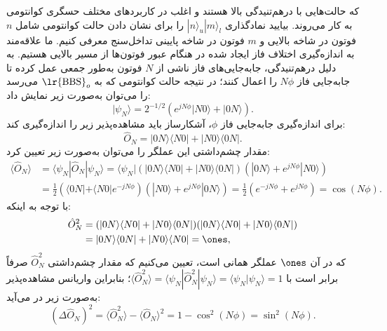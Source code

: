 که حالت‌هایی با درهم‌تنیدگی بالا هستند و اغلب در کاربردهای مختلف حسگری کوانتومی به کار می‌روند. بیایید نمادگذاری $|n\rangle_u |m\rangle_l$ را برای نشان دادن حالت کوانتومی شامل $n$ فوتون در شاخه بالایی و $m$ فوتون در شاخه پایینی تداخل‌سنج  معرفی کنیم. ما علاقه‌مند به اندازه‌گیری اختلاف فاز ایجاد شده در هنگام عبور فوتون‌ها از مسیر بالایی هستیم. به دلیل درهم‌تنیدگی، جابه‌جایی‌های فاز ناشی از $N$ فوتون به‌طور جمعی عمل کرده تا جابه‌جایی فاز $N\phi$ را اعمال کنند؛ در نتیجه حالت کوانتومی که به $\text{\lr{BBS}}_o$ می‌رسد را می‌توان به‌صورت زیر نمایش داد:
\begin{equation}
	|\psi_N\rangle = 2^{-1/2} (e^{jN\phi}|N0\rangle + |0N\rangle).
	\label{eq:11-31}
\end{equation}
برای اندازه‌گیری جابه‌جایی فاز $\phi$، آشکارساز باید مشاهده‌پذیر زیر را اندازه‌گیری کند:
\begin{equation}
	\hat{O}_N = |0N\rangle \langle N0| + |N0\rangle \langle 0N|.
	\label{eq:11-32}
\end{equation}
مقدار چشم‌داشتی این عملگر را می‌توان به‌صورت زیر تعیین کرد:
\begin{equation}
	\begin{aligned}
		\langle \hat{O}_N \rangle &= \langle \psi_N | \hat{O}_N | \psi_N \rangle = \langle \psi_N | (|0N\rangle \langle N0| + |N0\rangle \langle 0N|) (|0N\rangle + e^{jN\phi}|N0\rangle) \\
		&= \frac{1}{2} (\langle 0N| + \langle N0|e^{-jN\phi}) (|N0\rangle + e^{jN\phi}|0N\rangle) = \frac{1}{2} (e^{-jN\phi} + e^{jN\phi}) = \cos(N\phi).
		\label{eq:11-33}
	\end{aligned}
\end{equation}
با توجه به اینکه:
\begin{equation}
	\begin{aligned}
		\hat{O}_N^2 &= (|0N\rangle \langle N0| + |N0\rangle \langle 0N|) (|0N\rangle \langle N0| + |N0\rangle \langle 0N|) \\
		&= |0N\rangle \langle 0N| + |N0\rangle \langle N0| = \ones,
		\label{eq:11-34}
	\end{aligned}
\end{equation}
که در آن $\ones$ عملگر همانی است، تعیین می‌کنیم که مقدار چشم‌داشتی $\hat{O}_N^2$ صرفاً برابر است با $\langle \hat{O}_N^2 \rangle = \langle \psi_N | \hat{O}_N^2 | \psi_N \rangle = \langle \psi_N | \psi_N \rangle = 1$؛ بنابراین واریانس مشاهده‌پذیر به‌صورت زیر در می‌آید:
\begin{equation}
	(\Delta \hat{O}_N)^2 = \langle \hat{O}_N^2 \rangle - \langle \hat{O}_N \rangle^2 = 1 - \cos^2(N\phi) = \sin^2(N\phi).
	\label{eq:11-35}
\end{equation}
